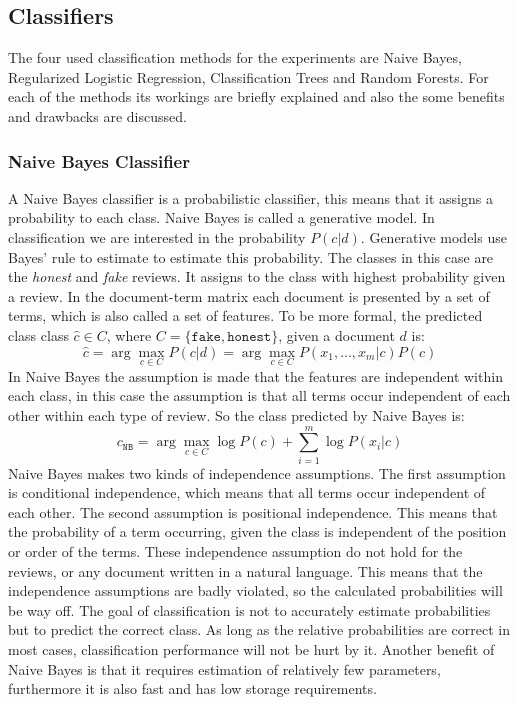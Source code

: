 \documentclass[a4paper,11pt]{article}
\begin{document}
\subsection{Classifiers}
The four used classification methods for the experiments are Naive Bayes, Regularized Logistic Regression, Classification Trees and Random Forests. For each of the methods its workings are briefly explained and also the some benefits and drawbacks are discussed.

\subsubsection{Naive Bayes Classifier}
A Naive Bayes classifier is a probabilistic classifier, this means that it assigns a probability to each class. Naive Bayes is called a generative model. In classification we are interested in the probability $P(c|d)$. Generative models use Bayes' rule to estimate to estimate this probability. The classes in this case are the \textit{honest} and \textit{fake} reviews. It assigns to the class with highest probability given a review. In the document-term matrix each document is presented by a set of terms, which is also called a set of features. To be more formal, the predicted class class $\hat{c} \in C$, where $C = \{\texttt{fake},\texttt{honest}\}$, given a document $d$ is: \[\hat{c} = \arg\max\limits_{c \in C} P(c|d) = \arg\max\limits_{c \in C} P(x_1, \ldots,x_m|c)P(c)\]
In Naive Bayes the assumption is made that the features are independent within each class, in this case the assumption is that all terms occur independent of each other within each type of review. So the class predicted by Naive Bayes is:
\[
c_{\texttt{NB}} = \arg\max\limits_{c \in C}\log P(c) + \sum\limits_{i=1}^{m}\log P(x_i|c)
\]
Naive Bayes makes two kinds of independence assumptions. The first assumption is conditional independence, which means that all terms occur independent of each other. The second assumption is positional independence. This means that the probability of a term occurring, given the class is independent of the position or order of the terms. These independence assumption do not hold for the reviews, or any document written in a natural language. This means that the independence assumptions are badly violated, so the calculated probabilities will be way off. The goal of classification is not to accurately estimate probabilities but to predict the correct class. As long as the relative probabilities are correct in most cases, classification performance will not be hurt by it. Another benefit of Naive Bayes is that it requires estimation of relatively few parameters, furthermore it is also fast and has low storage requirements.  
\end{document}
